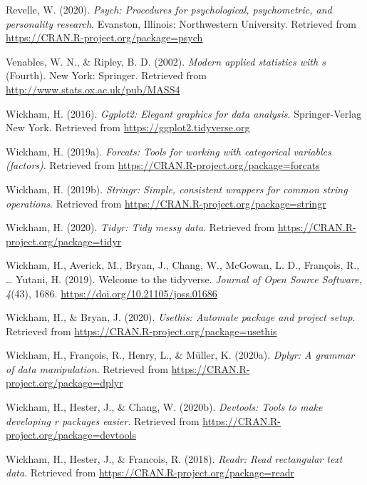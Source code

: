 \documentclass[
  english,
  man]{apa6}
\begin{document}
\leavevmode\hypertarget{ref-R-psych}{}%
Revelle, W. (2020). \emph{Psych: Procedures for psychological, psychometric, and personality research}. Evanston, Illinois: Northwestern University. Retrieved from \url{https://CRAN.R-project.org/package=psych}

\leavevmode\hypertarget{ref-R-MASS}{}%
Venables, W. N., \& Ripley, B. D. (2002). \emph{Modern applied statistics with s} (Fourth). New York: Springer. Retrieved from \url{http://www.stats.ox.ac.uk/pub/MASS4}

\leavevmode\hypertarget{ref-R-ggplot2}{}%
Wickham, H. (2016). \emph{Ggplot2: Elegant graphics for data analysis}. Springer-Verlag New York. Retrieved from \url{https://ggplot2.tidyverse.org}

\leavevmode\hypertarget{ref-R-forcats}{}%
Wickham, H. (2019a). \emph{Forcats: Tools for working with categorical variables (factors)}. Retrieved from \url{https://CRAN.R-project.org/package=forcats}

\leavevmode\hypertarget{ref-R-stringr}{}%
Wickham, H. (2019b). \emph{Stringr: Simple, consistent wrappers for common string operations}. Retrieved from \url{https://CRAN.R-project.org/package=stringr}

\leavevmode\hypertarget{ref-R-tidyr}{}%
Wickham, H. (2020). \emph{Tidyr: Tidy messy data}. Retrieved from \url{https://CRAN.R-project.org/package=tidyr}

\leavevmode\hypertarget{ref-R-tidyverse}{}%
Wickham, H., Averick, M., Bryan, J., Chang, W., McGowan, L. D., François, R., \ldots{} Yutani, H. (2019). Welcome to the tidyverse. \emph{Journal of Open Source Software}, \emph{4}(43), 1686. \url{https://doi.org/10.21105/joss.01686}

\leavevmode\hypertarget{ref-R-usethis}{}%
Wickham, H., \& Bryan, J. (2020). \emph{Usethis: Automate package and project setup}. Retrieved from \url{https://CRAN.R-project.org/package=usethis}

\leavevmode\hypertarget{ref-R-dplyr}{}%
Wickham, H., François, R., Henry, L., \& Müller, K. (2020a). \emph{Dplyr: A grammar of data manipulation}. Retrieved from \url{https://CRAN.R-project.org/package=dplyr}

\leavevmode\hypertarget{ref-R-devtools}{}%
Wickham, H., Hester, J., \& Chang, W. (2020b). \emph{Devtools: Tools to make developing r packages easier}. Retrieved from \url{https://CRAN.R-project.org/package=devtools}

\leavevmode\hypertarget{ref-R-readr}{}%
Wickham, H., Hester, J., \& Francois, R. (2018). \emph{Readr: Read rectangular text data}. Retrieved from \url{https://CRAN.R-project.org/package=readr}
\end{document}
